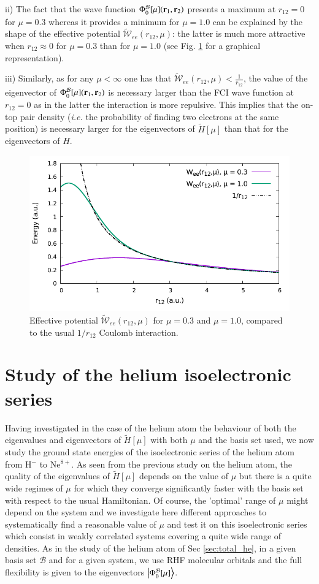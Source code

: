 \documentclass[aip,jcp,reprint,noshowkeys,superscriptaddress,twocolumn]{revtex4-1}
\newcommand{\br}[0]{{\bf {r}}}
\newcommand{\phimub}[0]{\Phi^{\mathcal{B}}_0[\mu]}
\newcommand{\basis}[0]{\mathcal{B}}
\begin{document}
ii) The fact that the wave function $\phimub(\br{}_1,\br{}_2)$ presents a maximum at $r_{12}=0$ for $\mu=0.3$ whereas it provides a minimum for $\mu=1.0$ can be explained by the shape of the effective potential $\tilde{\mathcal{W}}_{ee}(r_{12},\mu)$: the latter is much more attractive when $r_{12}\approx 0$ for $\mu=0.3$ than for $\mu = 1.0$ (see Fig. \ref{fig_wee_compare} for a graphical representation). 

iii) Similarly, as for any $\mu < \infty$ one has that $\tilde{\mathcal{W}}_{ee}(r_{12},\mu) <\frac{1}{r_{12}}$, the value of the eigenvector of $\phimub(\br{}_1,\br{}_2)$ is necessary larger than the FCI wave function at $r_{12}=0$ as in the latter the interaction is more repulsive. This implies that the on-top pair density (\textit{i.e.} the probability of finding two electrons at the same position) is necessary larger for the eigenvectors of $\tilde{H}[\mu]$ than that for the eigenvectors of $H$.

\begin{figure}
        \includegraphics[width=0.45\linewidth]{plots/jastrow/w_ee_zoom.pdf}
        \caption{
        Effective potential $\tilde{\mathcal{W}}_{ee}(r_{12},\mu)$ for $\mu=0.3$ and $\mu=1.0$, compared to the usual $1/r_{12}$ Coulomb interaction.}
 \label{fig_wee_compare}
\end{figure}

\section{Study of the helium isoelectronic series}
\label{sec:iso_elec}
Having investigated in the case of the helium atom the behaviour of both the eigenvalues and eigenvectors of $\tilde{H}[\mu]$ with both $\mu$ and the basis set used, we now study the ground state energies of the isoelectronic series of the helium atom from H$^{-}$ to Ne$^{8+}$. As seen from the previous study on the helium atom, the quality of the eigenvalues of $\tilde{H}[\mu]$ depends on the value of $\mu$ but there is a quite wide regimes of $\mu$ for which they converge significantly faster with the basis set with respect to the usual Hamiltonian. Of course, the 'optimal' range of $\mu$ might depend on the system and we investigate here different approaches to systematically find a reasonable value of $\mu$ and test it on this isoelectronic series which consist in weakly correlated systems covering a quite wide range of densities. 
As in the study of the helium atom of Sec \ref{sec:total_he}, in a given basis set $\basis$ and for a given system, we use RHF molecular orbitals and the full flexibility is given to the eigenvectors $\ket{\phimub}$. 
\end{document}
